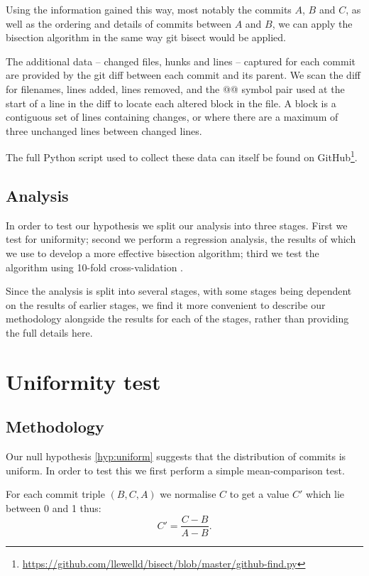 \documentclass[10pt,journal,compsoc]{IEEEtran}
\begin{document}
Using the information gained this way, most notably the commits $A$, $B$ and $C$, as well as the ordering and details of commits between $A$ and $B$, we can apply the bisection algorithm in the same way {\code git bisect} would be applied.

The additional data -- changed files, hunks and lines -- captured for each commit are provided by the git diff between each commit and its parent. We scan the diff for filenames, lines added, lines removed, and the {\code @@} symbol pair used at the start of a line in the diff to locate each altered block in the file. A block is a contiguous set of lines containing changes, or where there are a maximum of three unchanged lines between changed lines.

The full Python script used to collect these data can itself be found on GitHub\footnote{\url{https://github.com/llewelld/bisect/blob/master/github-find.py}}.

\subsection{Analysis}

In order to test our hypothesis we split our analysis into three stages. First we test for uniformity; second we perform a regression analysis, the results of which we use to develop a more effective bisection algorithm; third we test the algorithm using 10-fold cross-validation \cite{}.

Since the analysis is split into several stages, with some stages being dependent on the results of earlier stages, we find it more convenient to describe our methodology alongside the results for each of the stages, rather than providing the full details here.

\section{Uniformity test}
\label{section-uniformity}

\subsection{Methodology}

Our null hypothesis \ref{hyp:uniform} suggests that the distribution of commits is uniform. In order to test this we first perform a simple mean-comparison test.

For each commit triple $(B, C, A)$ we normalise $C$ to get a value $C'$ which lie between 0 and 1 thus:
$$
C' = \frac{C - B}{A - B} .
$$
\end{document}
